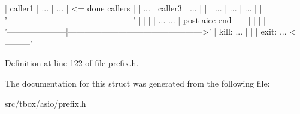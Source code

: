 \begin{DoxyPre}
                                                           |   caller1   |     ...      |     ...        | <= done callers                |
                                                           |     ...     |   caller3    |     ...        |                                |
                                                           |     ...     |     ...      |     ...        |                                |
                                                           '---------------------------------------------'                                |
                                                                  |              |                                                        | 
                                                                 ...            ...                                                       |
                                                             post aice          end ----                                                  |
                                                                  |                     |                                                 |
                                                                  '---------------------|------------------------------------------------>'
                                                                                        |
kill:                                                                  ...              |
                                                                        |               |
exit:                                                                  ...    <---------'\end{DoxyPre}



\begin{DoxyPre}\end{DoxyPre}
 

Definition at line 122 of file prefix.\-h.



The documentation for this struct was generated from the following file\-:\begin{DoxyCompactItemize}
\item 
src/tbox/asio/prefix.\-h\end{DoxyCompactItemize}

